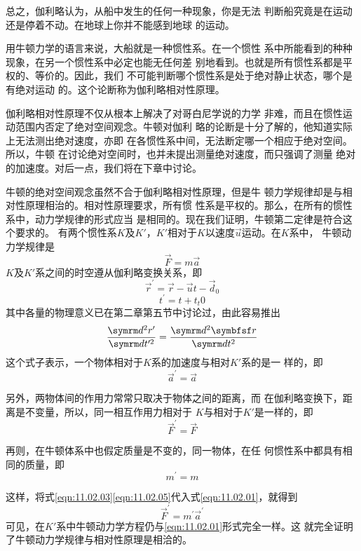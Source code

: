总之，伽利略认为，从船中发生的任何一种现象，你是无法
判断船究竟是在运动还是停着不动。在地球上你并不能感到地球
的运动。

用牛顿力学的语言来说，大船就是一种惯性系。在一个惯性
系中所能看到的种种现象，在另一个惯性系中必定也能无任何差
别地看到。也就是所有惯性系都是平权的、等价的。因此，我们
不可能判断哪个惯性系是处于绝对静止状态，哪个是有绝对运动
的。这个论断称为伽利略相对性原理。

伽利略相对性原理不仅从根本上解决了对哥白尼学说的力学
非难，而且在惯性运动范围内否定了绝对空间观念。牛顿对伽利
略的论断是十分了解的，他知道实际上无法测出绝对速度，亦即
在各惯性系中间，无法断定哪一个相应于绝对空间。所以，牛顿
在讨论绝对空间时，也并未提出测量绝对速度，而只强调了测量
绝对的加速度。对后一点，我们将在下章中讨论。

牛顿的绝对空间观念虽然不合于伽利略相对性原理，但是牛
顿力学规律却是与相对性原理相治的。相对性原理要求，所有惯
性系是平权的。那么，在所有的惯性系中，动力学规律的形式应当
是相同的。现在我们证明，牛顿第二定律是符合这个要求的。
有两个惯性系$ K $及$ K' $，$ K' $相对于$ K $以速度$ \vec{u} $运动。在$ K $系中，
牛顿动力学规律是
\begin{equation}\label{eqn:11.02.01}
  \vec{F} = m \vec{a}
\end{equation}
$ K $及$ K' $系之间的时空遵从伽利略变换关系，即
\begin{equation}\label{eqn:11.02.02}
  \vec{r} ^ { \prime } = \vec{r} - \vec{u} t - \vec{d} _ { 0 }
\end{equation}
\begin{equation*}
  t ^ { \prime } = t + t _t { 0 }
\end{equation*}
其中各量的物理意义已在第二章第五节中讨论过，由此容易推出
\begin{equation*}
  \frac { \dif ^ { 2 } r ^ { \prime } } { \dif t ^ { \prime 2 } } = \frac { \dif ^ { 2 } \vec{r} } { \dif t ^ { 2 } }
\end{equation*}
这个式子表示，一个物体相对于$ K $系的加速度与相对$ K' $系的是一
样的，即
\begin{equation}\label{eqn:11.02.03}
  \vec{a} ^ { \prime } = \vec{a}
\end{equation}

另外，两物体间的作用力常常只取决于物体之间的距离，而
在伽利略变换下，距离是不变量，所以，同一相互作用力相对于
$ K $与相对于$ K' $是一样的，即
\begin{equation}\label{eqn:11.02.04}
  \vec{F} ^ { \prime } = \vec{F}
\end{equation}

再则，在牛顿体系中也假定质量是不变的，同一物体，在任
何惯性系中都具有相同的质量，即
\begin{equation}\label{eqn:11.02.05}
  m ^ { \prime } = m
\end{equation}

这样，将式\eqref{eqn:11.02.03}\eqref{eqn:11.02.05}代入式\eqref{eqn:11.02.01}，就得到
\begin{equation}\label{eqn:11.02.06}
  \vec{F} ^ { \prime } = m ^ { \prime } \vec{a} ^ { \prime }
\end{equation}
可见，在$ K' $系中牛顿动力学方程仍与\eqref{eqn:11.02.01}形式完全一样。这
就完全证明了牛顿动力学规律与相对性原理是相洽的。
